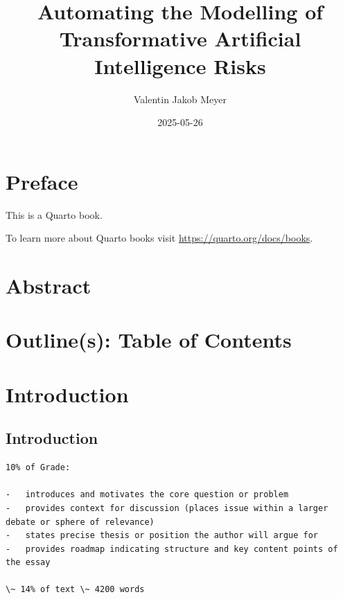 \documentclass[
  letterpaper,
]{book}
\title{Automating the Modelling of Transformative Artificial
Intelligence Risks}
\author{Valentin Jakob Meyer}
\date{2025-05-26}
\renewcommand*\contentsname{Table of contents}
\newcommand\contentsname{Table of contents}
\begin{document}
\frontmatter
\maketitle

\renewcommand*\contentsname{Table of contents}
{
\setcounter{tocdepth}{2}
\tableofcontents
}

\mainmatter
{}

\chapter*{Preface}\label{preface}


This is a Quarto book.

To learn more about Quarto books visit
\url{https://quarto.org/docs/books}.


\chapter*{Abstract}\label{sec-Abstract}



\chapter*{Outline(s): Table of Contents}\label{sec-ToC}



\chapter{Introduction}\label{introduction}

\section{Introduction}\label{introduction-1}

\begin{verbatim}
10% of Grade:

-   introduces and motivates the core question or problem
-   provides context for discussion (places issue within a larger debate or sphere of relevance)
-   states precise thesis or position the author will argue for
-   provides roadmap indicating structure and key content points of the essay

\~ 14% of text \~ 4200 words
\end{verbatim}
\end{document}
